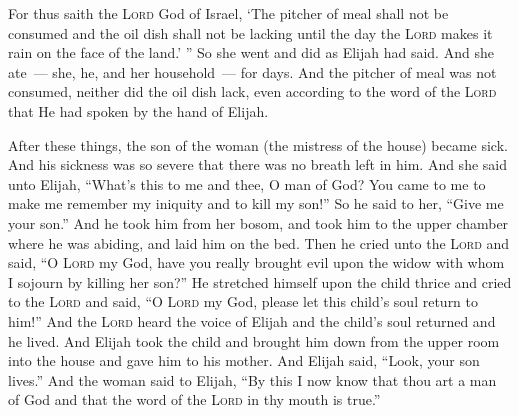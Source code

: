 \begin{inparaenum}
   For thus saith the \textsc{Lord} God of Israel, `The pitcher of meal shall not be consumed and the oil dish shall not be lacking until the day the \textsc{Lord} makes it rain on the face of the land.' ''%
   So she went and did as Elijah had said. And she ate~--- she, he, and her household~--- for days.%
   And the pitcher of meal was not consumed, neither did the oil dish lack, even according to the word of the \textsc{Lord} that He had spoken by the hand of Elijah.%
  
   After these things, the son of the woman (the mistress of the house) became sick. And his sickness was so severe that there was no breath left in him.%
   And she said unto Elijah, ``What's this to me and thee, O man of God? You came to me to make me remember my iniquity and to kill my son!''%
   So he said to her, ``Give me your son.'' And he took him from her bosom, and took him to the upper chamber where he was abiding, and laid him on the bed.%
   Then he cried unto the \textsc{Lord} and said, ``O \textsc{Lord} my God, have you really brought evil upon the widow with whom I sojourn by killing her son?''%
   He stretched himself upon the child thrice and cried to the \textsc{Lord} and said, ``O \textsc{Lord} my God, please let this child's soul return to him!''%
   And the \textsc{Lord} heard the voice of Elijah and the child's soul returned and he lived.%
   And Elijah took the child and brought him down from the upper room into the house and gave him to his mother. And Elijah said, ``Look, your son lives.''%
   And the woman said to Elijah, ``By this I now know that thou art a man of God and that the word of the \textsc{Lord} in thy mouth is true.''%
\end{inparaenum}
